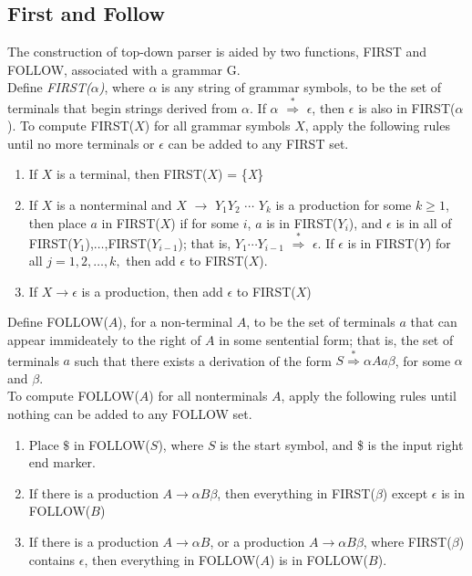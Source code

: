 \documentclass[12pt]{article}
\begin{document}
\subsection{First and Follow}
The construction of top-down parser is aided by two functions, FIRST and FOLLOW, associated with a grammar G.\\
	Define \textit{FIRST(}$\alpha$\textit{)}, where $\alpha$ is any string of grammar symbols, to be the set of terminals that begin strings derived from $\alpha$. If $\alpha$ $\overset{\ast}{\Rightarrow}$ $\epsilon$, then $\epsilon$ is also in FIRST($\alpha$).
To compute FIRST($X$) for all grammar symbols $X$, apply the following rules until no more terminals or $\epsilon$ can be added to any FIRST set.
\begin{enumerate}
\item If $X$ is a terminal, then FIRST($X$) = \{\textit X\}
\item If $X$ is a nonterminal and $X$ $\rightarrow$ $Y_1$$Y_2$ $\cdots$ $Y_k$ is a production for some $k \ge 1$, then place $a$ in FIRST($X$) if for some $i$, $a$ is in FIRST($\textit{Y}_i$), and $\epsilon$ is in all of FIRST($\textit{Y}_1$),$\dots$,FIRST($Y_{i-1}$); that is, $Y_1$$\cdots$$Y_{i-1}$ $\overset{\ast}{\Rightarrow}$ $\epsilon$. If $\epsilon$ is in FIRST($Y$) for all $j=1,2,\dots,k,$ then add $\epsilon$ to FIRST($X$).
\item If $X \rightarrow \epsilon$ is a production, then add $\epsilon$ to FIRST($X$)
\end{enumerate}
Define FOLLOW($A$), for a non-terminal $A$, to be the set of terminals $a$ that can appear immideately to the right of $A$ in some sentential form; that is, the set of terminals $a$ such that there exists a derivation of the form $S \overset{\ast}{\Rightarrow} \alpha Aa\beta$, for some $\alpha$ and $\beta$. \\
To compute FOLLOW($A$) for all nonterminals $A$, apply the following rules until nothing can be added to any FOLLOW set.
\begin{enumerate}
\item Place $\$$ in FOLLOW($S$), where $S$ is the start symbol, and \$ is the input right end marker.
\item If there is a production $A \rightarrow \alpha B\beta$, then everything in FIRST($\beta$) except $\epsilon$ is in FOLLOW($B$)
\item If there is a production $A \rightarrow \alpha B$, or a production $A \rightarrow \alpha B\beta$, where FIRST($\beta$) contains $\epsilon$, then everything in FOLLOW($A$) is in FOLLOW($B$).
\end{enumerate} 
\end{document}
